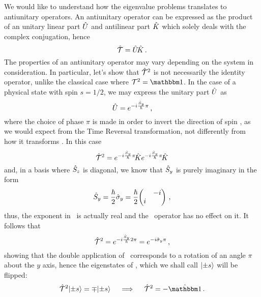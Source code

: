             We would like to understand how the eigenvalue problems translates to antiunitary operators. An antiunitary operator can be expressed \cite{Sakurai2020-pu} as the product of an unitary linear part $\hat{U}$ and antilinear part $\hat{K}$ which solely deals with the complex conjugation, hence
            \begin{equation}
                \label{eq:antiunitary-operator}
                \mathcal{\hat{T}} = \hat{U}\!\hat{K}
                \,\text{.}
            \end{equation}
            The properties of an antiunitary operator may vary depending on the system in consideration. In particular, let's show that $\mathcal{\hat{T}}^2$ is not necessarily the identity operator, unlike the classical case where $\mcT^2 = \idM$. In the case of a physical state with spin $s = 1/2$, we may express the unitary part $\hat{U}$ as
            \begin{equation*}
                \hat{U} = e^{-i \frac{\hat{S}_y}{\hbar} \pi}
                \,\text{,}
            \end{equation*}
            where the choice of phase $\pi$ is made in order to invert the direction of spin \hvS, as we would expect from the Time Reversal transformation, not differently from how it transforms \hvp. In this case
            \begin{equation*}
                \mathcal{\hat{T}}^2 = e^{-i \frac{\hat{S}_y}{\hbar} \pi}\! \hat{K} e^{-i \frac{\hat{S}_y}{\hbar} \pi}\! \hat{K}
            \end{equation*}
            and, in a basis where $\hat{S}_z$ is diagonal, we know that $\hat{S}_y$ is purely imaginary in  the form
            \begin{equation*}
                \hSy
                = \frac{\hbar}{2} \togglehat{\sigma}_y
                = \frac{\hbar}{2} \!\pmqty{\admat{-i,i}}
                \mycomma
            \end{equation*}
            thus, the exponent in \hU\ is actually real and the \hK\ operator has no effect on it. It follows that
            \begin{equation*}
                \mathcal{\hat{T}}^2
                = e^{-i \frac{\hat{S}_y}{\hbar} 2\pi}
                = e^{-i \hat{\sigma}_y \pi}
                \,\text{,}
            \end{equation*}
            showing that the double application of \hT\ corresponds to a rotation of an angle $\pi$ about the $y$ axis, hence the eigenstates of \hSz, which we shall call $\ket{\pm s}$ will be flipped:
            \begin{equation*}
                \hT^2 \!\ket{\pm s} = \mp\! \ket{\pm s}
                \quad\implies\quad
                \hT^2 = -\togglehat{\idM}
                \myperiod
            \end{equation*}

